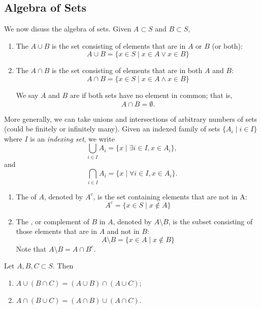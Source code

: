 \subsection{Algebra of Sets}
We now disuss the algebra of sets. Given $A \subset S$ and $B \subset S$,
\begin{enumerate}[label=(\roman*)]
\item The  $A \cup B$ is the set consisting of elements that are in $A$ or $B$ (or both):
\[ A\cup B=\{x \in S \mid x\in A \lor x\in B\} \]

\item The  $A \cap B$ is the set consisting of elements that are in both $A$ and $B$:
\[ A\cap B=\{x \in S \mid x\in A \land x\in B\} \]

We say $A$ and $B$ are  if both sets have no element in common; that is,
\[A\cap B=\emptyset.\]
\end{enumerate}

More generally, we can take unions and intersections of arbitrary numbers of sets (could be finitely or infinitely many). Given an indexed family of sets $\{A_i\mid i\in I\}$ where $I$ is an \emph{indexing set}, we write
\[\bigcup_{i\in I}A_i=\{x \mid \exists i\in I, x\in A_i\},\]
and
\[\bigcap_{i\in I}A_i=\{x \mid \forall i\in I, x\in A_i\}.\]

\begin{enumerate}[resume*]
\item The  of $A$, denoted by $A^c$, is the set containing elements that are not in A:
\[ A^c = \{x \in S \mid x \notin A\} \]

\item The , or complement of $B$ in $A$, denoted by $A\setminus B$, is the subset consisting of those elements that are in $A$ and not in $B$:
\[ A\setminus B = \{x \in A \mid x \notin B\} \]
Note that $A\setminus B = A \cap B^c$.
\end{enumerate}

\begin{lemma}
Let $A,B,C\subset S$. Then
\begin{enumerate}[label=(\roman*)]
\item $A\cup(B\cap C)=(A\cup B)\cap(A\cup C)$;
\item $A\cap(B\cup C)=(A\cap B)\cup(A\cap C)$.
\end{enumerate}
\end{lemma}

